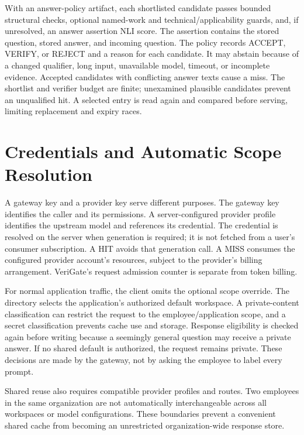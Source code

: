 With an answer-policy artifact, each shortlisted candidate passes bounded structural checks, optional named-work and technical/applicability guards, and, if unresolved, an answer assertion NLI score. The assertion contains the stored question, stored answer, and incoming question. The policy records ACCEPT, VERIFY, or REJECT and a reason for each candidate. It may abstain because of a changed qualifier, long input, unavailable model, timeout, or incomplete evidence. Accepted candidates with conflicting answer texts cause a miss. The shortlist and verifier budget are finite; unexamined plausible candidates prevent an unqualified hit. A selected entry is read again and compared before serving, limiting replacement and expiry races.

\section{Credentials and Automatic Scope Resolution}
A gateway key and a provider key serve different purposes. The gateway key identifies the caller and its permissions. A server-configured provider profile identifies the upstream model and references its credential. The credential is resolved on the server when generation is required; it is not fetched from a user's consumer subscription. A HIT avoids that generation call. A MISS consumes the configured provider account's resources, subject to the provider's billing arrangement. VeriGate's request admission counter is separate from token billing.

For normal application traffic, the client omits the optional scope override. The directory selects the application's authorized default workspace. A private-content classification can restrict the request to the employee/application scope, and a secret classification prevents cache use and storage. Response eligibility is checked again before writing because a seemingly general question may receive a private answer. If no shared default is authorized, the request remains private. These decisions are made by the gateway, not by asking the employee to label every prompt.

Shared reuse also requires compatible provider profiles and routes. Two employees in the same organization are not automatically interchangeable across all workspaces or model configurations. These boundaries prevent a convenient shared cache from becoming an unrestricted organization-wide response store.

